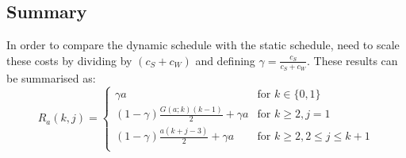 \subsection{Summary}
In order to compare the dynamic schedule with the static schedule, need to scale these costs by dividing by $(c_{S} + c_{W})$ and defining $\gamma = \frac{c_{S}}{c_{S} + c_{W}}$. These results can be summarised as:
\begin{equation}
	R_{a} (k, j) = \begin{cases}
		\gamma a & \text{for $k \in \{ 0, 1 \}$} \\
		(1 - \gamma) \frac{G (a; k) (k - 1)}{2} + \gamma a & \text{for $k \geq 2, j = 1$} \\
		(1 - \gamma) \frac{a (k + j - 3)}{2} + \gamma a & \text{for $k \geq 2, 2 \leq j \leq k + 1$} \\
	\end{cases}
\end{equation}

















































